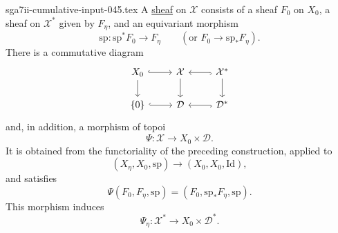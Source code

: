 \begin{filecontents*}{sga7ii-cumulative-input-045.tex}
A \underline{sheaf} on $\mathcal X$ consists of a sheaf $F_0$ on
$X_0$, a sheaf on $\mathcal X^*$ given by $F_\eta$, and an equivariant
morphism
\[
\mathrm{sp}:\mathrm{sp}^*F_0\longrightarrow F_\eta
\qquad
(\text{or }F_0\longrightarrow\mathrm{sp}_*F_\eta).
\]
There is a commutative diagram
\[
\begin{tikzcd}
X_0 \arrow[r, hook] \arrow[d]
  & \mathcal X \arrow[d]
  & \mathcal X^* \arrow[l, hook] \arrow[d] \\
\{0\} \arrow[r, hook]
  & \mathcal D
  & \mathcal D^* \arrow[l, hook]
\end{tikzcd}
\]
and, in addition, a morphism of topoi
\[
\Psi:\mathcal X\longrightarrow X_0\times\mathcal D.
\]
It is obtained from the functoriality of the preceding construction,
applied to
\[
(X_\eta,X_0,\mathrm{sp})
\longrightarrow(X_0,X_0,\mathrm{Id}),
\]
and satisfies
\[
\Psi(F_0,F_\eta,\mathrm{sp})
=(F_0,\mathrm{sp}_*F_\eta,\mathrm{sp}).
\]
This morphism induces
\[
\Psi_\eta:\mathcal X^*\longrightarrow X_0\times\mathcal D^*.
\]

\end{filecontents*}
